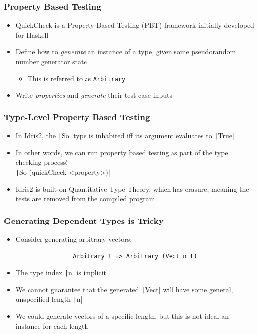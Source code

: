 \documentclass[compress,handout]{beamer}
\begin{document}
\begin{frame}[fragile]
  \frametitle{Property Based Testing}

  \begin{itemize}
    \item<1-> QuickCheck is a Property Based Testing (PBT) framework initially
              developed for Haskell
    \item<2-> Define how to \emph{generate} an instance of a type, given some
              pseudorandom number generator state
      \begin{itemize}
        \item<2-> This is referred to as \texttt{Arbitrary}
      \end{itemize}
    \item<3-> Write \emph{properties} and \emph{generate} their test case inputs
  \end{itemize}

\end{frame}


\begin{frame}[fragile]
  \frametitle{Type-Level Property Based Testing}

  \begin{itemize}
    \item<1-> In Idris2, the \texttt|So| type is inhabited iff its
              argument evaluates to \texttt|True|
    \item<2-> In other words, we can run property based testing as part of the
              type checking process!\\
              \texttt|So (quickCheck <property>)|
    \item<3-> Idris2 is built on Quantitative Type Theory, which has erasure,
              meaning the tests are removed from the compiled program
  \end{itemize}

\end{frame}


\begin{frame}[fragile]
  \frametitle{Generating Dependent Types is Tricky}

  \begin{itemize}
    \item<1-> Consider generating arbitrary vectors:
              \begin{verbatim}
                Arbitrary t => Arbitrary (Vect n t)
              \end{verbatim}
    \item<2-> The type index \texttt|n| is implicit
    \item<3-> We cannot guarantee that the generated \texttt|Vect|
              will have some general, unspecified length \texttt|n|
    \item<4-> We could generate vectors of a specific length, but this is not
              ideal {\textemdash} an instance for each length
  \end{itemize}

\end{frame}
\end{document}
